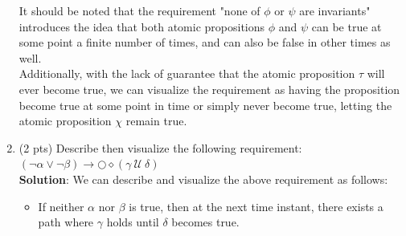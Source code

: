 \documentclass[12pt]{article}
\begin{document}
\begin{spacing}{1.5}
\begin{enumerate}
\begin{center}
		      \end{center}
		      		      		      		      		      		      
		      It should be noted that the requirement "none of $\phi$ or $\psi$ are invariants" introduces the idea that both atomic propositions $\phi$ and $\psi$ can be true at some point a finite number of times, and can also be false in other times as well.\\
		      		      		      		      		      		              
		      Additionally, with the lack of guarantee that the atomic proposition $\tau$ will ever become true, we can visualize the requirement as having the proposition become true at some point in time or simply never become true, letting the atomic proposition $\chi$ remain true.
		      		      		      		      		      		      
		\item (2 pts) Describe then visualize the following requirement: $(\neg \alpha \lor \neg \beta) \rightarrow \bigcirc \diamond (\gamma \: \mathcal{U} \: \delta)$\\
		      		      		      		      		      		      
		      \textbf{Solution}: We can describe and visualize the above requirement as follows:
		      		      		      		      		      		      
		      		      		      		      		      		              
		      \begin{itemize}
		      	\item If neither $\alpha$ nor $\beta$ is true, then at the next time instant, there exists a path where $\gamma$ holds until $\delta$ becomes true.
		      \end{itemize}
		      		      		      		      		      		      
		      \begin{center}
\end{center}
\end{enumerate}
\end{spacing}
\end{document}
